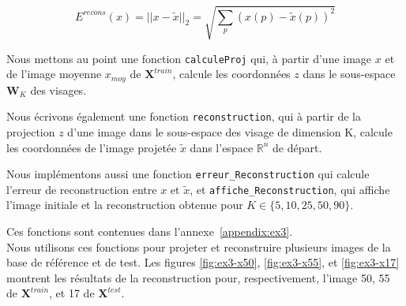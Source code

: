 \documentclass[a4paper]{article}
\newcommand{\annexeref}[1]{annexe~\ref{#1}}
\begin{document}
$$ E^{recons}(x) = || x - \tilde{x}||_2 = \sqrt{\sum_{p}(x(p) - \tilde{x}(p))^2}$$ 

Nous mettons au point une fonction \texttt{calculeProj} qui, à partir d'une
image $x$ et de l'image moyenne $x_{moy}$ de $\mathbf{X}^{train}$, calcule les
coordonnées $z$ dans le sous-espace $\mathbf{W}_K$ des visages. 

Nous écrivons également une fonction \texttt{reconstruction}, qui à partir de la
projection $z$ d’une image dans le sous-espace des visage de dimension K,
calcule les coordonnées de l’image projetée $\tilde{x}$ dans l’espace
$\mathbb{R}^n$ de départ. 

Nous implémentons aussi une fonction \texttt{erreur\_Reconstruction} qui calcule
l'erreur de reconstruction entre $x$ et $\tilde{x}$, et
\texttt{affiche\_Reconstruction}, qui affiche l'image initiale et la
reconstruction obtenue pour $K \in \{5, 10, 25, 50, 90\}$.

Ces fonctions sont contenues dans l'\annexeref{appendix:ex3}. \\

Nous utilisons ces fonctions pour projeter et reconstruire plusieurs images de
la base de référence et de test. Les figures \ref{fig:ex3-x50}, \ref{fig:ex3-x55},
et \ref{fig:ex3-x17} montrent les résultats de la
reconstruction pour, respectivement, l'image 50, 55 de $\mathbf{X}^{train}$, et
17 de $\mathbf{X}^{test}$.
\end{document}

